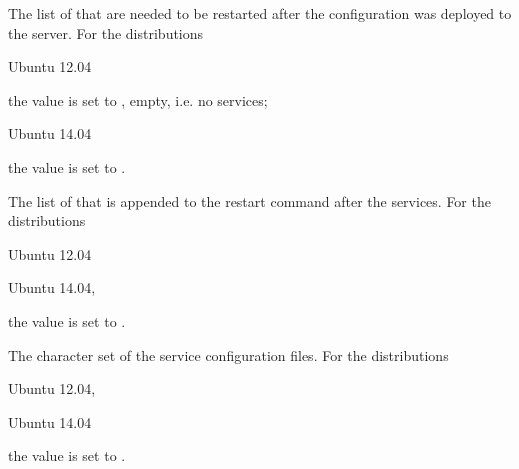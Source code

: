 The list of  that are needed to be restarted after the 
configuration was deployed to the server.
For the distributions
\begin{inparaitem}
\item[\TheDistribution{ubuntu}] Ubuntu 12.04
\end{inparaitem}
the value is set to \qcode{}, empty, i.e. no services;
%
\begin{inparaitem}
\item[\TheDistribution{ubuntu}] Ubuntu 14.04
\end{inparaitem}
the value is set to .


The list of  that is appended to the restart command after the services.
For the distributions
\begin{inparaitem}
\item[\TheDistribution{ubuntu}] Ubuntu 12.04
\item[\TheDistribution{ubuntu}] Ubuntu 14.04,
\end{inparaitem}
the value is set to .



The character set  of the service configuration files. 
For the distributions
\begin{inparaitem}
\item[\TheDistribution{ubuntu}] Ubuntu 12.04,
\item[\TheDistribution{ubuntu}] Ubuntu 14.04
\end{inparaitem}
the value is set to .
